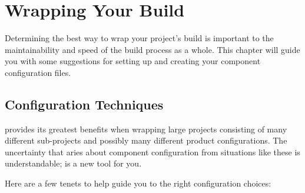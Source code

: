 %
%
%
%
\chapter{Wrapping Your Build}\label{chap:wrapping}

Determining the best way to wrap your project's build is important to
the maintainability and speed of the build process as a whole.  This
chapter will guide you with some suggestions for setting up and
creating your component configuration files.

\section{Configuration Techniques}

\lmsbw provides its greatest benefits when wrapping large projects
consisting of many different sub-projects and possibly many different
product configurations.  The uncertainty that aries about component
configuration from situations like these is understandable; \lmsbw is
a new tool for you.

Here are a few tenets to help guide you to the right configuration
choices:


